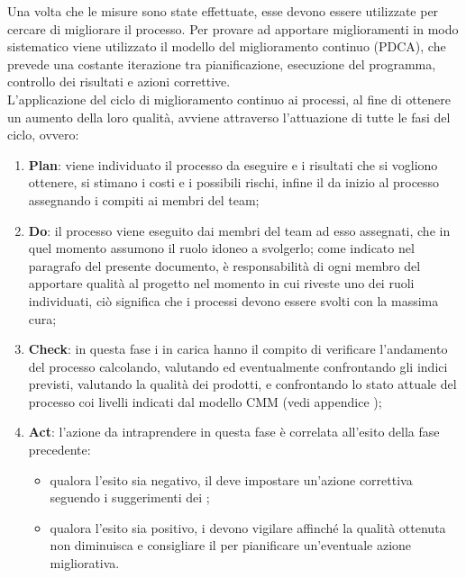 		Una volta che le misure sono state effettuate, esse devono essere utilizzate per cercare di migliorare il processo. Per provare ad apportare miglioramenti in modo sistematico viene utilizzato il modello del miglioramento continuo (PDCA), che prevede una costante iterazione tra pianificazione, esecuzione del programma, controllo dei risultati e azioni correttive.\\
		L'applicazione del ciclo di miglioramento continuo ai processi, al fine di ottenere un aumento della loro qualità, avviene attraverso l'attuazione di tutte le fasi del ciclo, ovvero:
		\begin{enumerate}
		\item \textbf{Plan}: viene individuato il processo da eseguire e i risultati che si vogliono ottenere, si stimano i costi e i possibili rischi, infine il  da inizio al processo assegnando i compiti ai membri del team;
		\item \textbf{Do}: il processo viene eseguito dai membri del team ad esso assegnati, che in quel momento assumono il ruolo idoneo a svolgerlo; come indicato nel paragrafo  del presente documento, è responsabilità di ogni membro del \groupname{} apportare qualità al progetto nel momento in cui riveste uno dei ruoli individuati, ciò significa che i processi devono essere svolti con la massima cura;
		\item \textbf{Check}: in questa fase i  in carica hanno il compito di verificare l'andamento del processo calcolando, valutando ed eventualmente confrontando gli indici previsti, valutando la qualità dei prodotti, e confrontando lo stato attuale del processo coi livelli indicati dal modello CMM (vedi appendice );
		\item \textbf{Act}: l'azione da intraprendere in questa fase è correlata all'esito della fase precedente:
		\begin{itemize}
		\item qualora l'esito sia negativo, il  deve impostare un'azione correttiva seguendo i suggerimenti dei ;
		\item qualora l'esito sia positivo, i  devono vigilare affinché la qualità ottenuta non diminuisca e consigliare il  per pianificare un'eventuale azione migliorativa.
		\end{itemize}
		\end{enumerate}
